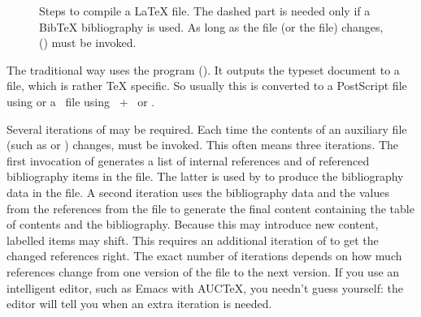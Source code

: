 \begin{figure}
  \medskip
  \par\medskip
  \caption[Steps to compile a LaTeX file]{Steps to compile a LaTeX file.
    The dashed part is needed only if a BibTeX bibliography is used.
    As long as the  file (or the  file) changes,
    () must be invoked.}\label{fig:compile}
\end{figure}
The traditional way uses the  program (). It
outputs the typeset document to a  file, which is rather TeX
specific. So usually this is converted to a PostScript file using
 or a \PDF\ file using ~+~ or
.

Several iterations of  may be required. Each time the contents
of an auxiliary file (such as  or ) changes,
 must be invoked. This often means three iterations. The first
invocation of  generates a list of internal references and of
referenced bibliography items in the  file. The latter is used
by  to produce the bibliography data in the  file.
A second iteration uses the bibliography data and the values from the
references from the  file to generate the final content
containing the table of contents and the bibliography. Because this may
introduce new content, labelled items may shift. This requires an additional
iteration of  to get the changed references right. The exact
number  of iterations depends on how much references change from one
version of the  file to the next version. If you use an
intelligent editor, such as Emacs with AUCTeX, you needn't guess
yourself: the editor will tell you when an extra iteration is needed.

